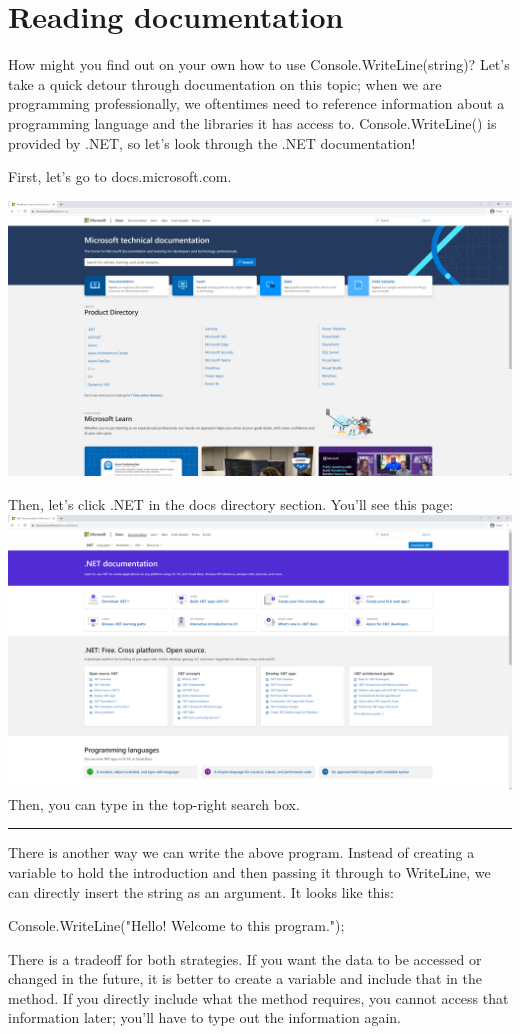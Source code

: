 \documentclass[oneside, openany] {book}
\begin{document}
\section{Reading documentation}
How might you find out on your own how to use Console.WriteLine(string)? Let's take a quick detour through documentation on this topic; when we are programming professionally, we oftentimes need to reference information about a programming language and the libraries it has access to. Console.WriteLine() is provided by .NET, so let's look through the .NET documentation!

First, let's go to docs.microsoft.com.

\includegraphics[scale = 0.2]{MicrosoftDocs1}

Then, let's click .NET in the docs directory section. You'll see this page:
\includegraphics[scale = 0.2]{MicrosoftDocs2}
Then, you can type  in the top-right search box.
\par\noindent\rule{\textwidth}{0.4pt}
There is another way we can write the above program. Instead of creating a variable to hold the introduction and then passing it through to WriteLine, we can directly insert the string as an argument. It looks like this:
\begin{CSharp}
Console.WriteLine("Hello! Welcome to this program.");
\end{CSharp}
There is a tradeoff for both strategies. If you want the data to be accessed or changed in the future, it is better to create a variable and include that in the method. If you directly include what the method requires, you cannot access that information later; you'll have to type out the information again.
\end{document}
